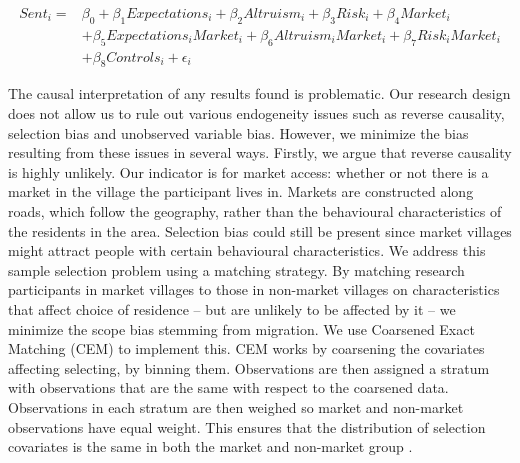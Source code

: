 \begin{equation}
\begin{split}
\label{eq:interaction}
Sent_i = & \beta_0 + \beta_1 Expectations_i + \beta_2 Altruism_i + \beta_3 Risk_i + \beta_4 Market_i \\
&+  \beta_5 Expectations_i Market_i +  \beta_6 Altruism_i Market_i   + \beta_7 Risk_i Market_i \\
& + \beta_8 Controls_i + \epsilon_i 
\end{split}
\end{equation} 


The causal interpretation of any results found is problematic. Our research design does not allow us to  rule out various endogeneity issues such as reverse causality, selection bias and unobserved variable bias. However, we minimize the bias resulting from these issues in several ways. Firstly, we argue that reverse causality is highly unlikely. Our indicator is for market access: whether or not there is a market in the village the participant lives in. Markets are constructed along roads, which follow the geography, rather than the behavioural characteristics of the residents in the area. Selection bias could still be present since market villages might attract people with certain behavioural characteristics. We address this sample selection problem using a matching strategy. By matching research participants in market villages to those in non-market villages on characteristics that affect choice of residence -- but are unlikely to be affected by it -- we minimize the scope bias stemming from migration. We use  Coarsened Exact Matching (CEM) to implement this. CEM works by coarsening the covariates affecting selecting, by binning them. Observations are then assigned a stratum with observations that are the same with respect to the coarsened data. Observations in each stratum are then weighed so market and non-market observations have equal weight. This ensures that the distribution of selection covariates is the same in both the market and non-market group \citep[for a full review of the advantages of CEM over other matching procedures such as Propensity Score Matching, see ][]{Iacus2012}.


